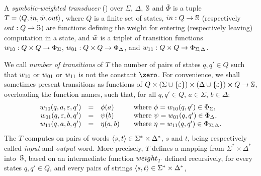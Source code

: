 \begin{definition}
\label{def:transducer} \label{def:SWT}
A \emph{symbolic-weighted transducer} (\SWT)
over $\Sigma$, $\Delta$, $\mathbb{S}$ and $\bar\Phi$
is a tuple
$T = \< Q, \init, \bar{\wei}, \final >$,
where $Q$ is a finite set of states,
$\mathsf{in} : Q \to \Semiring$   %
(respectively $\mathsf{out} : Q \to \Semiring$)  %
are functions defining the weight for entering
(respectively leaving) computation in a state,
and $\bar{\wei}$ is a triplet of transition functions
$\wei_{10}: Q \times Q \to \Phi_{\Sigma}$,
$\wei_{01}: Q \times Q \to \Phi_{\Delta}$, and
$\wei_{11}: Q \times Q \to \Phi_{\Sigma, \Delta}$.
\end{definition}
%
\noindent
We call \emph{number of transitions} of $T$ the number of pairs of states
$q, q' \in Q$ such that $\wei_{10}$ or $\wei_{01}$ or $\wei_{11}$
is not the constant $\zero$.
%
\noindent
For convenience, we shall sometimes present transitions
as functions of
$Q \times (\Sigma \cup \{ \varepsilon \}) \times (\Delta \cup \{ \varepsilon \}) \times Q \to \mathbb{S}$,
overloading the function names,
such that, for all $q, q' \in Q$, $a \in \Sigma$,  $b \in \Delta$:
\[
\begin{array}{rcll}
\wei_{10}(q, a, \varepsilon, q') & = & \phi(a) & %
\quad\mathrm{where~} \phi = \wei_{10}(q, q') \in \Phi_\Sigma,\\
\wei_{01}(q, \varepsilon, b, q') & = & \psi(b) &
\quad\mathrm{where~} \psi = \wei_{01}(q, q') \in \Phi_\Delta,\\
\wei_{11}(q, a, b, q') & = & \eta(a, b) &
\quad\mathrm{where~} \eta = \wei_{11}(q, q') \in \Phi_{\Sigma, \Delta}.\\
\end{array}
\]
%
\noindent
The \SWT $T$ computes on pairs of words $\< s, t> \in \Sigma^* \times \Delta^*$,
$s$ and $t$, being respectively called \emph{input} and \emph{output} word.
More precisely, $T$ defines a mapping
from $\Sigma^* \times \Delta^*$ into~$\mathbb{S}$,
based on an intermediate function $\weight_T$
defined recursively, for every states $q, q' \in Q$,
and every pairs of strings $\< s, t> \in \Sigma^* \times \Delta^*$,

